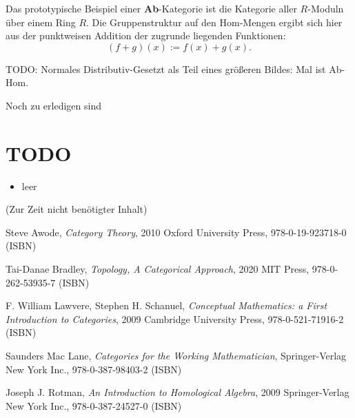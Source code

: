 \documentclass[a4paper]{amsart}
\theoremstyle{definition}
\begin{document}
Das prototypische Beispiel einer \textbf{Ab}-Kategorie ist die Kategorie aller $R$-Moduln über einem  Ring $R$. Die Gruppenstruktur auf den Hom-Mengen ergibt sich hier aus der punktweisen Addition der zugrunde liegenden Funktionen:
\begin{equation}
   (f+g)(x) := f(x) + g(x).
\end{equation}  

TODO: Normales Distributiv-Gesetzt als Teil eines größeren Bildes: Mal ist Ab-Hom.


\begin{backup}
Noch zu erledigen sind
\section{TODO}
\begin{itemize}
   \item leer
\end{itemize}
\end{backup}

\begin{backup}
    (Zur Zeit nicht benötigter Inhalt)
\end{backup}

\begin{thebibliography}{9}
      Steve Awode, \emph{Category Theory},
      2010 Oxford University Press, 978-0-19-923718-0 (ISBN)

      Tai-Danae Bradley, \emph{Topology, A Categorical Approach},
      2020 MIT Press, 978-0-262-53935-7 (ISBN)

      F. William Lawvere, Stephen H. Schanuel, \emph{Conceptual Mathematics: a First Introduction to Categories},
      2009 Cambridge University Press, 978-0-521-71916-2 (ISBN)

      Saunders Mac Lane, \emph{Categories for the Working Mathematician},
      Springer-Verlag New York Inc., 978-0-387-98403-2 (ISBN)

   	Joseph J. Rotman, \emph{An Introduction to Homological Algebra},
   	2009 Springer-Verlag New York Inc., 978-0-387-24527-0 (ISBN)
      
\end{thebibliography}
\end{document}
